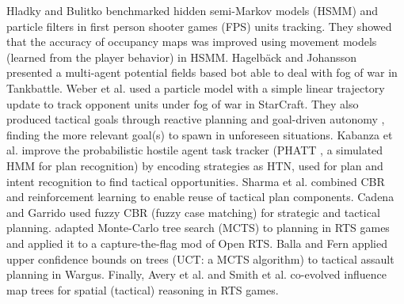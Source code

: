 \documentclass[journal]{IEEEtran}
\begin{document}
Hladky and Bulitko \cite{Hladky2008} benchmarked hidden semi-Markov models (HSMM) and particle filters in first person shooter games (FPS) units tracking. They showed that the accuracy of occupancy maps was improved using movement models (learned from the player behavior) in HSMM. Hagelb\"{a}ck and Johansson \cite{HagelbackJ08} presented a multi-agent potential fields based bot able to deal with fog of war in Tankbattle. Weber et al. \cite{WeberAIIDE11} used a particle model with a simple linear trajectory update to track opponent units under fog of war in StarCraft. They also produced tactical goals through reactive planning and goal-driven autonomy \cite{WeberCig10,Weber10}, finding the more relevant goal(s) to spawn in unforeseen situations. Kabanza et al. \cite{OBRecog} improve the probabilistic hostile agent task tracker (PHATT \cite{PHATT}, a simulated HMM for plan recognition) by encoding strategies as HTN, used for plan and intent recognition to find tactical opportunities. Sharma et al. \cite{CBR-RL} combined CBR and reinforcement learning to enable reuse of tactical plan components. Cadena and Garrido \cite{CadenaG11} used fuzzy CBR (fuzzy case matching) for strategic and tactical planning. \cite{Chung05} adapted Monte-Carlo tree search (MCTS) to planning in RTS games and applied it to a capture-the-flag mod of Open RTS. Balla and Fern \cite{UCT} applied upper confidence bounds on trees (UCT: a MCTS algorithm) to tactical assault planning in Wargus. %
Finally, Avery et al. \cite{Avery09} and Smith et al. \cite{SmithCIG10} co-evolved influence map trees for spatial (tactical) reasoning in RTS games. 
\end{document}
